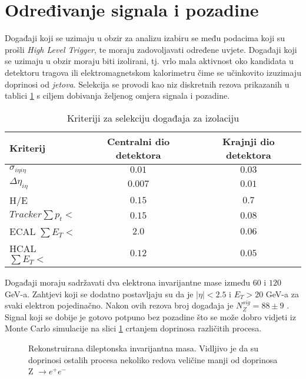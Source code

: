 \documentclass[a4paper,12pt]{report}
\begin{document}
\section{Određivanje signala i pozadine}
Događaji koji se uzimaju u obzir za analizu izabiru se među podacima koji su prošli \textit{High Level Trigger}, te moraju zadovoljavati određene uvjete. Događaji koji se uzimaju u obzir moraju biti izolirani, tj. vrlo mala aktivnost oko kandidata u detektoru tragova ili elektromagnetskom kalorimetru čime se učinkovito izuzimaju doprinosi od \textit{jetova}. Selekcija se provodi kao niz diskretnih rezova prikazanih u tablici \ref{tab:cuts} s ciljem dobivanja željenog omjera signala i pozadine.\\
\begin{table}[h!]
\centering
  \begin{tabular}{l c c}
    \hline
    \hline
    Kriterij & Centralni dio detektora & Krajnji dio detektora \\
    \hline
    $\sigma_{i\eta i\eta}$ & $0.01$ & $0.03$ \\
    $\Delta \eta_{i\eta}$ & $0.007$ & $0.01$ \\
    H/E & $0.15$ & $0.7$ \\
    \hline
    $Tracker \sum p_t <$ & $0.15$ & $0.08$ \\
    ECAL $\sum E_T <$ & $2.0$ & $0.06$ \\
    HCAL $\sum E_T <$ & $0.12$ & $0.05$ \\
  \hline
  \hline
  
  \end{tabular}
\label{tab:cuts}
\caption{Kriteriji za selekciju događaja za izolaciju}
\end{table}

Događaji moraju sadržavati dva elektrona invarijantne mase između $60$ i $120$ GeV-a. Zahtjevi koji se dodatno postavljaju su da je $|\eta| < 2.5$ i $E_T > 20$ GeV-a za svaki elektron pojedinačno. Nakon ovih rezova broj događaja je $N^{sig}_Z = 88 \pm 9$ . Signal koji se dobije je gotovo potpuno bez pozadine što se može dobro vidjeti iz Monte Carlo simulacije na slici \ref{pozadina} crtanjem doprinosa različitih procesa.
\begin{figure}
  \label{pozadina}
  \caption[Dileptonska invarijantna masa]{Rekonstruirana dileptonska invarijantna masa. Vidljivo je da su doprinosi ostalih procesa nekoliko redova veličine manji od doprinosa Z $\rightarrow e^+ e^-$}
\end{figure}
\end{document}
